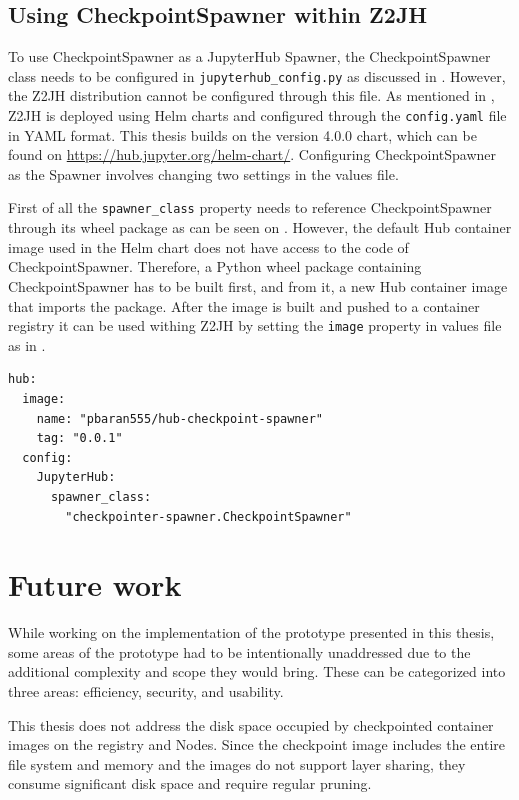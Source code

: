 \documentclass[
  digital,     %
  oneside,     %
  nosansbold,  %
  nocolorbold, %
  lof,         %
  nolot,         %
]{fithesis4}
\newenvironment{code}{\captionsetup{type=listing}}{}
\begin{document}
\section{Using CheckpointSpawner within Z2JH}
To use CheckpointSpawner as a JupyterHub Spawner, the CheckpointSpawner class needs to be configured in \texttt{jupyterhub\_config.py} as discussed in . However, the Z2JH distribution cannot be configured through this file. As mentioned in , Z2JH is deployed using Helm charts and configured through the \texttt{config.yaml} file in YAML format. This thesis builds on the version 4.0.0 chart, which can be found on \url{https://hub.jupyter.org/helm-chart/}. Configuring CheckpointSpawner as the Spawner involves changing two settings in the values file.

First of all the \texttt{spawner\_class} property needs to reference CheckpointSpawner through its wheel package as can be seen on . However, the default Hub container image used in the Helm chart does not have access to the code of CheckpointSpawner. Therefore, a Python wheel package containing CheckpointSpawner has to be built first, and from it, a new Hub container image that imports the package. After the image is built and pushed to a container registry it can be used withing Z2JH by setting the \texttt{image} property in values file as in .


\begin{code}
\label{lst:z2jh:values}
\begin{verbatim}
hub:
  image:
    name: "pbaran555/hub-checkpoint-spawner"
    tag: "0.0.1"
  config:
    JupyterHub:
      spawner_class: 
        "checkpointer-spawner.CheckpointSpawner"
\end{verbatim}
\end{code}


\chapter{Future work}
While working on the implementation of the prototype presented in this thesis, some areas of the prototype had to be intentionally unaddressed due to the additional complexity and scope they would bring. These can be categorized into three areas: efficiency, security, and usability.

This thesis does not address the disk space occupied by checkpointed container images on the registry and Nodes. Since the checkpoint image includes the entire file system and memory and the images do not support layer sharing, they consume significant disk space and require regular pruning.
\end{document}
